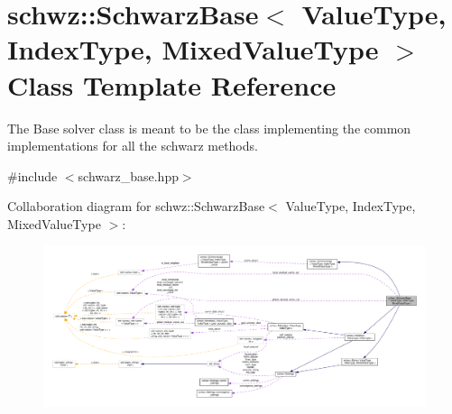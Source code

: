 \hypertarget{classschwz_1_1SchwarzBase}{}\section{schwz\+:\+:Schwarz\+Base$<$ Value\+Type, Index\+Type, Mixed\+Value\+Type $>$ Class Template Reference}
\label{classschwz_1_1SchwarzBase}


The Base solver class is meant to be the class implementing the common implementations for all the schwarz methods.  




{\ttfamily \#include $<$schwarz\+\_\+base.\+hpp$>$}



Collaboration diagram for schwz\+:\+:Schwarz\+Base$<$ Value\+Type, Index\+Type, Mixed\+Value\+Type $>$\+:
\nopagebreak
\begin{figure}[H]
\begin{center}
\leavevmode
\includegraphics[width=350pt]{classschwz_1_1SchwarzBase__coll__graph}
\end{center}
\end{figure}
